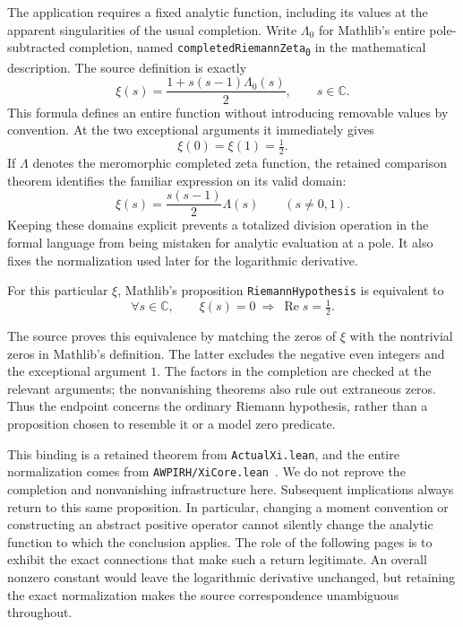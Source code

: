 \label{act:xi}
The application requires a fixed analytic function, including its values at
the apparent singularities of the usual completion. Write $\Lambda_0$ for
Mathlib's entire pole-subtracted completion, named
\texttt{completedRiemannZeta\textsubscript{0}} in the mathematical
description. The source definition is exactly
\begin{equation}\label{act:xi-normalization}
 \xi(s)=\frac{1+s(s-1)\Lambda_0(s)}{2},\qquad s\in\mathbb C.
\end{equation}
This formula defines an entire function without introducing removable
values by convention. At the two exceptional arguments it immediately gives
\begin{equation}
 \xi(0)=\xi(1)=\tfrac12.
\end{equation}
If $\Lambda$ denotes the meromorphic completed zeta function, the retained
comparison theorem identifies the familiar expression on its valid domain:
\begin{equation}
 \xi(s)=\frac{s(s-1)}2\Lambda(s)\qquad(s\ne0,1).
\end{equation}
Keeping these domains explicit prevents a totalized division operation in
the formal language from being mistaken for analytic evaluation at a pole.
It also fixes the normalization used later for the logarithmic derivative.

\begin{proposition}\label{act:rh-binding}
For this particular $\xi$, Mathlib's proposition
\texttt{RiemannHypothesis} is equivalent to
\begin{equation}\label{act:xi-rh}
 \forall s\in\mathbb C,\qquad
 \xi(s)=0\ \Longrightarrow\ \operatorname{Re}s=\tfrac12.
\end{equation}
\end{proposition}
The source proves this equivalence by matching the zeros of $\xi$ with
the nontrivial zeros in Mathlib's definition. The latter excludes the
negative even integers and the exceptional argument $1$. The factors in
the completion are checked at the relevant arguments; the nonvanishing
theorems also rule out extraneous zeros. Thus the endpoint concerns the
ordinary Riemann hypothesis, rather than a proposition chosen to resemble
it or a model zero predicate.

This binding is a retained theorem from \texttt{ActualXi.lean}, and the
entire normalization comes from \texttt{AWPIRH/XiCore.lean}~\cite{source}.
We do not reprove the completion and nonvanishing infrastructure here.
Subsequent implications always return to this same proposition. In
particular, changing a moment convention or constructing an abstract
positive operator cannot silently change the analytic function to which
the conclusion applies. The role of the following pages is to exhibit
the exact connections that make such a return legitimate.
An overall nonzero constant would leave the logarithmic derivative
unchanged, but retaining the exact normalization makes the source
correspondence unambiguous throughout.


